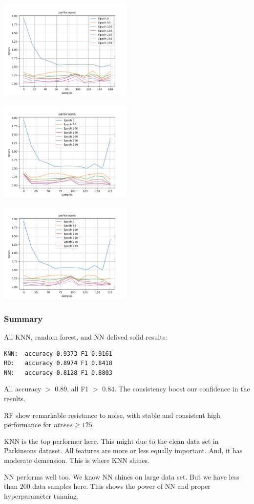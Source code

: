 \includegraphics[width=0.5\textwidth]{./figures/proj_parkinsons_8.png}

\includegraphics[width=0.5\textwidth]{./figures/proj_parkinsons_9.png}

\includegraphics[width=0.5\textwidth]{./figures/proj_parkinsons_10.png}

\subsubsection{Summary}

All KNN, random forest, and NN delived solid results:    

\begin{verbatim}
KNN:  accuracy 0.9373 F1 0.9161
RD:   accuracy 0.8974 F1 0.8418
NN:   accuracy 0.8128 F1 0.8803
\end{verbatim}

All accuracy $>$ 0.89, all F1 $>$ 0.84. The consistency boost our confidence in the results.  

RF show remarkable resistance to noise, with stable and consistent high performance for $ntrees \ge 125$.  

KNN is the top performer here.
This might due to the clean data set in Parkinsons dataset.
All features are more or less equally important.
And, it has moderate demension.
This is where KNN shines.


NN performs well too.
We know NN shines on large data set.
But we have less than 200 data samples here.
This shows the power of NN and proper hyperparameter tunning.
